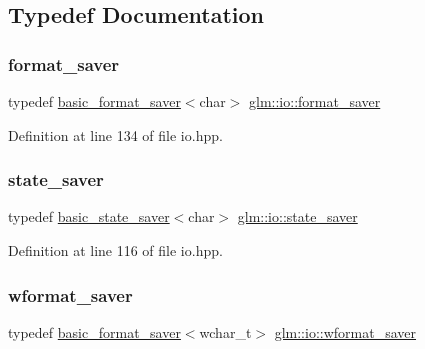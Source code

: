 \subsection{Typedef Documentation}
\mbox{\label{namespaceglm_1_1io_afdc168a994ef9e9ca4295578e9097495}} 
\subsubsection{\texorpdfstring{format\+\_\+saver}{format\_saver}}
{\footnotesize\ttfamily typedef \hyperlink{classglm_1_1io_1_1basic__format__saver}{basic\+\_\+format\+\_\+saver}$<$char$>$ \hyperlink{namespaceglm_1_1io_afdc168a994ef9e9ca4295578e9097495}{glm\+::io\+::format\+\_\+saver}}



Definition at line 134 of file io.\+hpp.

\mbox{\label{namespaceglm_1_1io_a84d63ac771c3125d38f144dc15234764}} 
\subsubsection{\texorpdfstring{state\+\_\+saver}{state\_saver}}
{\footnotesize\ttfamily typedef \hyperlink{classglm_1_1io_1_1basic__state__saver}{basic\+\_\+state\+\_\+saver}$<$char$>$ \hyperlink{namespaceglm_1_1io_a84d63ac771c3125d38f144dc15234764}{glm\+::io\+::state\+\_\+saver}}



Definition at line 116 of file io.\+hpp.

\mbox{\label{namespaceglm_1_1io_a6229ca888648a0ff823eb120f61de481}} 
\subsubsection{\texorpdfstring{wformat\+\_\+saver}{wformat\_saver}}
{\footnotesize\ttfamily typedef \hyperlink{classglm_1_1io_1_1basic__format__saver}{basic\+\_\+format\+\_\+saver}$<$wchar\+\_\+t$>$ \hyperlink{namespaceglm_1_1io_a6229ca888648a0ff823eb120f61de481}{glm\+::io\+::wformat\+\_\+saver}}



